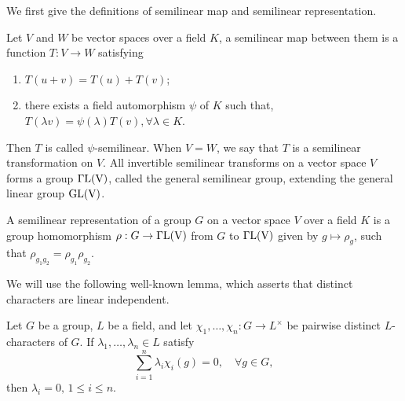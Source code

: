 \documentclass[hidelinks,onefignum,onetabnum]{siamart251216}
\theoremstyle{definition}
\theoremstyle{remark}
\begin{document}

We first give the definitions of semilinear map and semilinear representation.

\begin{definition}
Let $V$ and $W$ be vector spaces over a field $K$, a semilinear map between them is a function $T: V\to W$ satisfying


\begin{enumerate}
	\item $T(u+v)=T(u)+T(v)$;
	
	\item there exists a field automorphism $\psi $ of $K$ such that, $T(\lambda v)=\psi(\lambda)T(v), \forall \lambda\in K.$

\end{enumerate}
Then $T$ is called $\psi$-semilinear. When $V=W$, we say that $T$ is a semilinear transformation on $V$. All invertible semilinear transforms on a vector space $V$ forms a group $\Gamma\rm{L}(V)$, called the general semilinear group, extending the general linear group $\rm{GL}(V)$.
\end{definition}


\begin{definition}
A  semilinear representation of a group $G$ on a vector space $V$ over a field $K$ is a group homomorphism $\rho : G\to \Gamma\rm{L}(V)$ from $G$ to $\Gamma\rm{L}(V)$ given by $g\mapsto \rho_{g} $, such that $\rho_{g_{1}g_{2}}=\rho_{g_{1}}\rho_{g_{2}}$.
\end{definition}


We will use the following well-known lemma, which asserts that distinct characters are linear independent.

\begin{lemma}\label{lem:dedekind}
	Let $G$ be a group, $L$ be a field, and let $\chi_1, \dots, \chi_n : G \to L^{\times}$ be pairwise distinct $L$-characters of $G$. If $\lambda_1, \dots, \lambda_n \in L$ satisfy
	$$
	\sum_{i=1}^{n}\lambda_i \chi_i(g) = 0, \quad \forall  g \in G,
	$$
	then $\lambda_i =0, \, 1\le i\le n$.
\end{lemma}
\end{document}
